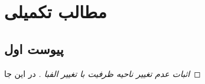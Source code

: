 
\section{مطالب تکمیلی}

\subsection{
پیوست اول
}\label{proof:l1}

\begin{proof}[
	اثبات عدم تغییر ناحیه ظرفیت با تغییر الفبا
	]
    در این جا
\end{proof}

